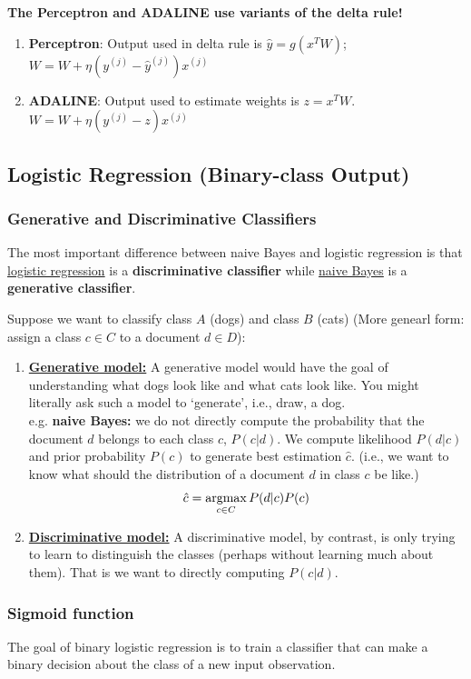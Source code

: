 \documentclass[11pt,a4paper]{article}
\newcommand{\argmax}{\operatornamewithlimits{argmax}}
\begin{document}
\textbf{The Perceptron and ADALINE use variants of the delta rule!}
\begin{enumerate}[(1)]
    \item \textbf{Perceptron}: Output used in delta rule is $\hat{y}=g(x^TW)$; $W=W+\eta(y^{(j)}-{\hat{y}}^{(j)})x^{(j)}$
    \item \textbf{ADALINE}: Output used to estimate weights is $z=x^TW$. $W=W+\eta(y^{(j)}-z)x^{(j)}$
\end{enumerate}

\subsection{Logistic Regression (Binary-class Output)}
\subsubsection{Generative and Discriminative Classifiers}
The most important difference between naive Bayes and logistic regression is that \underline{logistic regression} is a \textbf{discriminative classifier} while \underline{naive Bayes} is a \textbf{generative classifier}.

Suppose we want to classify class $A$ (dogs) and class $B$ (cats) (More genearl form: assign a class $c\in C$ to a document $d\in D$):
\begin{enumerate}[(1)]
    \item \underline{\textbf{Generative model:}} A generative model would have the goal of understanding what dogs look like and what cats look like. You might literally ask such a model to ‘generate’, i.e., draw, a dog.\\
    e.g. \textbf{naive Bayes:} we do not directly compute the probability that the document $d$ belongs to each class $c$, $P(c|d)$. We compute likelihood $P(d|c)$ and prior probability $P(c)$ to generate best estimation $\hat{c}$. (i.e., we want to know what should the distribution of a document $d$ in class $c$ be like.) $$\hat{c}=\argmax_{c\in C}P(d|c)P(c)$$
    \item \underline{\textbf{Discriminative model:}} A discriminative model, by contrast, is only trying to learn to distinguish the classes (perhaps without learning much about them). That is we want to directly computing $P(c|d)$.
\end{enumerate}

\subsubsection{Sigmoid function}
The goal of binary logistic regression is to train a classifier that can make a binary decision about the class of a new input observation.
\end{document}
